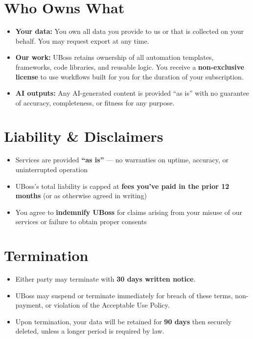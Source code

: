\documentclass[11pt,letterpaper]{scrartcl}
\begin{document}
\section{Who Owns What}

\begin{itemize}[nosep, leftmargin=1.5em]
    \item \textbf{Your data:} You own all data you provide to us or that is collected on your behalf. You may request export at any time.
    \item \textbf{Our work:} UBoss retains ownership of all automation templates, frameworks, code libraries, and reusable logic. You receive a \textbf{non-exclusive license} to use workflows built for you for the duration of your subscription.
    \item \textbf{AI outputs:} Any AI-generated content is provided ``as is'' with no guarantee of accuracy, completeness, or fitness for any purpose.
\end{itemize}

\section{Liability \& Disclaimers}

\begin{tcolorbox}[keyterm, title={Key Protections}]
\begin{itemize}[nosep, leftmargin=1.5em]
    \item Services are provided \textbf{``as is''} --- no warranties on uptime, accuracy, or uninterrupted operation
    \item UBoss's total liability is capped at \textbf{fees you've paid in the prior 12 months} (or as otherwise agreed in writing)
    \item You agree to \textbf{indemnify UBoss} for claims arising from your misuse of our services or failure to obtain proper consents
\end{itemize}
\end{tcolorbox}

\section{Termination}

\begin{itemize}[nosep, leftmargin=1.5em]
    \item Either party may terminate with \textbf{30 days written notice}.
    \item UBoss may suspend or terminate immediately for breach of these terms, non-payment, or violation of the Acceptable Use Policy.
    \item Upon termination, your data will be retained for \textbf{90 days} then securely deleted, unless a longer period is required by law.
\end{itemize}
\end{document}
